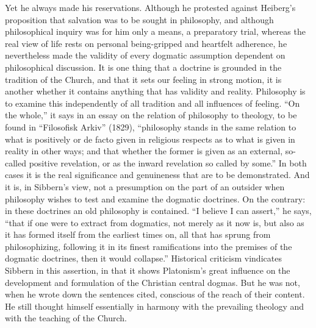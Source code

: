\documentclass[12pt,a4paper,openany]{book}
\newcommand{\opage}[1]{\marginnote{\footnotesize\textit{[#1]}}}
\begin{document}
Yet he always made his reservations. Although he
protested against Heiberg's proposition that salvation was to be sought in
philosophy, and although philosophical inquiry was for him only
a means, a preparatory trial, whereas the real
view of life rests on personal being-gripped and heartfelt
adherence, he nevertheless made the validity of every dogmatic
assumption dependent on philosophical discussion. It is one
thing that a doctrine is grounded in the tradition of the Church, and that
it sets our feeling in strong motion, it is another whether
\opage{92}it contains anything that has validity and reality.
Philosophy is to examine this independently of all tradition and all %
influences of feeling. ``On the whole,'' it says in an
essay on the relation of philosophy to theology, to be found
in ``Filosofisk Arkiv'' (1829), ``philosophy stands in the same relation to
what is positively or de facto given in religious respects as to
what is given in reality in other ways; and that whether
the former is given as an external, so-called positive
revelation, or as the inward revelation so called by some.'' In both cases
it is the real significance and genuineness that are to be demonstrated. And it is,
in Sibbern's view, not a presumption on the part of an outsider when philosophy
wishes to test and examine the dogmatic doctrines. On the
contrary: in these doctrines an old philosophy is contained.
``I believe I can assert,'' he says, ``that if one were to extract from
dogmatics, not merely as it now is, but also as
it has formed itself from the earliest times on, all
that has sprung from philosophizing, following it in its
finest ramifications into the premises of the dogmatic
doctrines, then it would collapse.'' Historical
criticism vindicates Sibbern in this assertion, in that it
shows Platonism's great influence on the development and formulation of
the Christian central dogmas. But he was not, when
he wrote down the sentences cited, conscious of the reach of
their content. He still thought himself essentially in
harmony with the prevailing theology and with the teaching of the Church.
\end{document}
